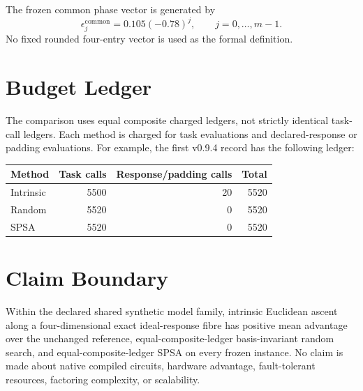 \documentclass[11pt]{article}
\begin{document}
The frozen common phase vector is generated by
\[
\epsilon^{\mathrm{common}}_j = 0.105(-0.78)^j,
\qquad j=0,\ldots,m-1.
\]
No fixed rounded four-entry vector is used as the formal definition.

\section{Budget Ledger}

The comparison uses equal composite charged ledgers, not strictly identical
task-call ledgers. Each method is charged for task evaluations and
declared-response or padding evaluations. For example, the first v0.9.4 record
has the following ledger:

\begin{center}
\begin{tabular}{lrrr}
\toprule
Method & Task calls & Response/padding calls & Total \\
\midrule
Intrinsic & 5500 & 20 & 5520 \\
Random & 5520 & 0 & 5520 \\
SPSA & 5520 & 0 & 5520 \\
\bottomrule
\end{tabular}
\end{center}

\section{Claim Boundary}

Within the declared shared synthetic model family, intrinsic Euclidean ascent
along a four-dimensional exact ideal-response fibre has positive mean advantage
over the unchanged reference, equal-composite-ledger basis-invariant random
search, and equal-composite-ledger SPSA on every frozen instance. No claim is
made about native compiled circuits, hardware advantage, fault-tolerant
resources, factoring complexity, or scalability.



\end{document}
